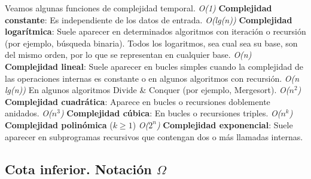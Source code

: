 \documentclass[10pt,a4paper]{article}
\begin{document}
Veamos algunas funciones de complejidad temporal. 
\newline
\newline
\textit{O(1)} \textbf{Complejidad constante}: Es independiente de los datos de entrada.
\newline
\newline
\textit{O(lg(n))} \textbf{Complejidad logarítmica}: Suele aparecer en determinados algoritmos con iteración o recursión (por ejemplo, búsqueda binaria). Todos los logaritmos, sea cual sea su base, son del mismo orden, por lo que se representan en cualquier base.
\newline
\newline
\textit{O(n)} \textbf{Complejidad lineal}: Suele aparecer en bucles simples cuando la complejidad de las operaciones internas es constante o en algunos algoritmos con recursión.
\newline
\newline
\textit{O(n lg(n))} En algunos algoritmos Divide \& Conquer (por ejemplo, Mergesort).
\newline
\newline
\textit{O($n^{2}$)} \textbf{Complejidad cuadrática}: Aparece en bucles o recursiones doblemente anidados.
\newline
\newline
\textit{O($n^{3}$)} \textbf{Complejidad cúbica}: En bucles o recursiones triples.
\newline
\newline
\textit{O($n^{k}$)} \textbf{Complejidad polinómica} ($k \geq 1$)
\newline
\newline
\textit{O($2^{n}$)} \textbf{Complejidad exponencial}: Suele aparecer en subprogramas recursivos que contengan dos o más llamadas internas.

\subsection{Cota inferior. Notación $\Omega$}
\end{document}
